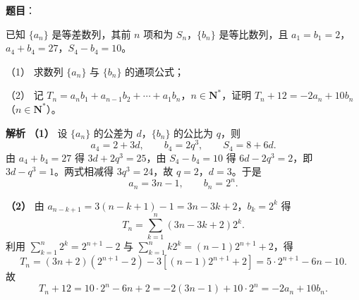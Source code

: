 \begin{answer}

\textbf{题目}：

已知 $\{a_n\}$ 是等差数列，其前 $n$ 项和为 $S_n$，$\{b_n\}$ 是等比数列，且 $a_1=b_1=2$，$a_4+b_4=27$，$S_4-b_4=10$。

（1） 求数列 $\{a_n\}$ 与 $\{b_n\}$ 的通项公式；

（2） 记 $T_n=a_nb_1+a_{n-1}b_2+\cdots+a_1b_n$，$n\in\mathbf N^*$，证明 $T_n+12=-2a_n+10b_n$（$n\in\mathbf N^*$）。

\textbf{解析}
\textbf{（1）} 设 $\{a_n\}$ 的公差为 $d$，$\{b_n\}$ 的公比为 $q$，则
\nopagebreak[4]
\[a_4=2+3d,\qquad b_4=2q^3,\qquad S_4=8+6d.\]
由 $a_4+b_4=27$ 得 $3d+2q^3=25$，由 $S_4-b_4=10$ 得 $6d-2q^3=2$，即 $3d-q^3=1$。两式相减得 $3q^3=24$，故 $q=2$，$d=3$。于是
\nopagebreak[4]
\[a_n=3n-1,\qquad b_n=2^n.\]

\textbf{（2）} 由 $a_{n-k+1}=3(n-k+1)-1=3n-3k+2$，$b_k=2^k$ 得
\nopagebreak[4]
\[T_n=\sum_{k=1}^n(3n-3k+2)2^k.\]
利用 $\displaystyle\sum_{k=1}^n2^k=2^{n+1}-2$ 与 $\displaystyle\sum_{k=1}^nk2^k=(n-1)2^{n+1}+2$，得
\nopagebreak[4]
\[T_n=(3n+2)(2^{n+1}-2)-3\left[(n-1)2^{n+1}+2\right]=5\cdot2^{n+1}-6n-10.\]
故
\nopagebreak[4]
\[T_n+12=10\cdot2^n-6n+2=-2(3n-1)+10\cdot2^n=-2a_n+10b_n.\]



\end{answer}
